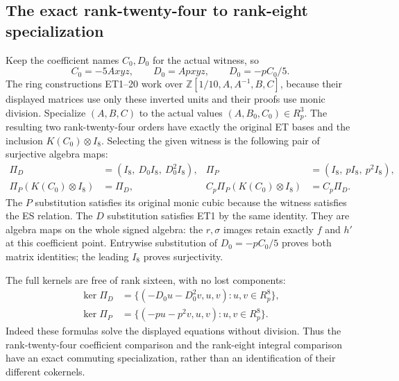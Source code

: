 \documentclass[11pt]{article}
\begin{document}
\subsection{The exact rank-twenty-four to rank-eight specialization}
Keep the coefficient names $C_0,D_0$ for the actual witness, so
\[
 C_0=-5Axyz,\qquad D_0=Apxyz,\qquad D_0=-pC_0/5 .
 \tag{PS13}
\]
The ring constructions ET1--20 work over
$\mathbb Z[1/10,A,A^{-1},B,C]$, because their displayed matrices
use only these inverted units and their proofs use monic division.
Specialize $(A,B,C)$ to the actual values $(A,B_0,C_0)\in R_p^3$.
The resulting two rank-twenty-four orders have exactly the original
ET bases and the inclusion $K(C_0)\otimes I_8$. Selecting the given
witness is the following pair of surjective algebra maps:
\[
 \begin{aligned}
 \Pi_D&=(I_8,\ D_0I_8,\ D_0^2I_8),&
 \Pi_P&=(I_8,\ pI_8,\ p^2I_8),\\
 \Pi_P(K(C_0)\otimes I_8)&=\Pi_D,&
 C_p\Pi_P(K(C_0)\otimes I_8)&=C_p\Pi_D .
 \end{aligned}\tag{PS14}
\]
The $P$ substitution satisfies its original monic cubic because the
witness satisfies the ES relation. The $D$ substitution satisfies ET1
by the same identity. They are algebra maps on the whole signed algebra:
the $r,\sigma$ images retain exactly $f$ and $h'$ at this coefficient
point. Entrywise substitution of $D_0=-pC_0/5$ proves both matrix
identities; the leading $I_8$ proves surjectivity.

The full kernels are free of rank sixteen, with no lost components:
\[
 \begin{aligned}
 \ker\Pi_D&=\{(-D_0u-D_0^2v,u,v):u,v\in R_p^8\},\\
 \ker\Pi_P&=\{(-pu-p^2v,u,v):u,v\in R_p^8\}.
 \end{aligned}\tag{PS15}
\]
Indeed these formulas solve the displayed equations without division.
Thus the rank-twenty-four coefficient comparison and the rank-eight
integral comparison have an exact commuting specialization, rather
than an identification of their different cokernels.
\end{document}
